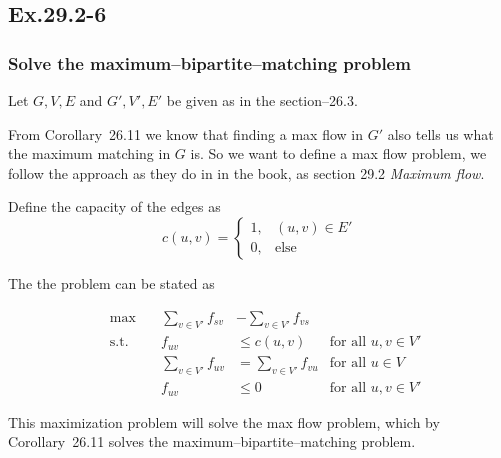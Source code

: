 \subsection*{Ex.29.2-6}
\subsubsection{Solve the maximum--bipartite--matching problem}

Let $G, V, E$ and $G', V', E'$ be given as in the section--26.3.

From Corollary~26.11 we know that finding a max flow in $G'$ also tells us what the maximum matching in $G$ is. So we want to define a max flow problem, we follow the approach as they do in in the book, as section 29.2 \emph{Maximum flow}.

Define the capacity of the edges as
$$
c(u,v) = 
\begin{cases}
1, & (u,v)\in E'\\
0, & \text{else}
\end{cases}
$$

The the problem can be stated as

\begin{align*}
&\max      \quad  &\sum_{v\in V'}f_{sv}  &- \sum_{v\in V'}f_{vs}   &\\
&\text{s.t.}      & f_{uv}               &\leq c(u,v)              &\text{for all } u,v \in V'\\
&                 & \sum_{v\in V'}f_{uv} &= \sum_{v\in V'}f_{vu}   &\text{for all } u \in V\\
&                 & f_{uv}               &\leq 0                   &\text{for all } u,v \in V'
\end{align*}

This maximization problem will solve the max flow problem, which by Corollary~26.11 solves the maximum--bipartite--matching problem.